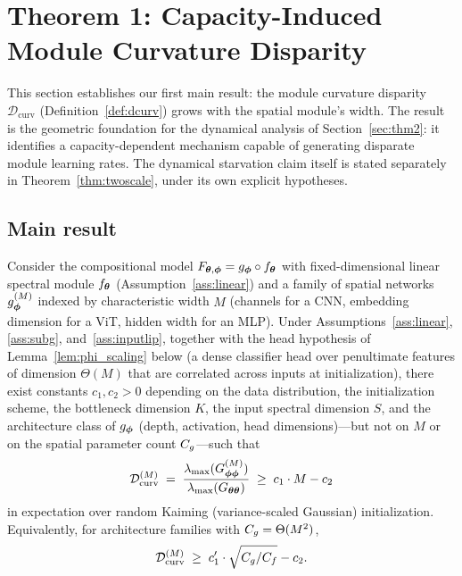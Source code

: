 \section{Theorem 1: Capacity-Induced Module Curvature Disparity}
\label{sec:thm1}

This section establishes our first main result: the module curvature
disparity $\mathcal{D}_{\mathrm{curv}}$
(Definition~\ref{def:dcurv}) grows with the spatial module's width.
The result is the geometric foundation for the dynamical analysis of
Section~\ref{sec:thm2}: it identifies a capacity-dependent mechanism
capable of generating disparate module learning rates. The dynamical
starvation claim itself is stated separately in
Theorem~\ref{thm:twoscale}, under its own explicit hypotheses.

\subsection{Main result}

\begin{theorem}
\label{thm:hessian}
Consider the compositional model $F_{{\boldsymbol{\theta}},{\boldsymbol{\phi}}} = g_{\boldsymbol{\phi}} \circ
f_{\boldsymbol{\theta}}$ with fixed-dimensional linear spectral module $f_{\boldsymbol{\theta}}$
(Assumption~\ref{ass:linear}) and a family of spatial networks
$g_{\boldsymbol{\phi}}^{(M)}$ indexed by characteristic width $M$
(channels for a CNN, embedding dimension for a ViT, hidden width for
an MLP). Under
Assumptions~\ref{ass:linear}, \ref{ass:subg},
and~\ref{ass:inputlip}, together with the head
hypothesis of Lemma~\ref{lem:phi_scaling} below (a dense classifier
head over penultimate features of dimension $\Theta(M)$ that are
correlated across inputs at initialization), there exist
constants $c_1, c_2 > 0$ depending on the data distribution, the
initialization scheme, the bottleneck dimension $K$, the input
spectral dimension $S$, and the architecture class of $g_{\boldsymbol{\phi}}$
(depth, activation, head dimensions)---but not on $M$ or on the
spatial parameter count $C_g$---such that
\[
    \mathcal{D}_{\mathrm{curv}}^{(M)}
    \;=\; \frac{\lambda_{\max}(G^{(M)}_{{\boldsymbol{\phi}}{\boldsymbol{\phi}}})}
                {\lambda_{\max}(G_{{\boldsymbol{\theta}}{\boldsymbol{\theta}}})}
    \;\geq\; c_1 \cdot M - c_2
\]
in expectation over random Kaiming (variance-scaled Gaussian)
initialization. Equivalently, for architecture families with
$C_g = \Theta(M^2)$,
\[
    \mathcal{D}_{\mathrm{curv}}^{(M)}
    \;\geq\; c_1' \cdot \sqrt{C_g / C_f} - c_2.
\]
\end{theorem}

